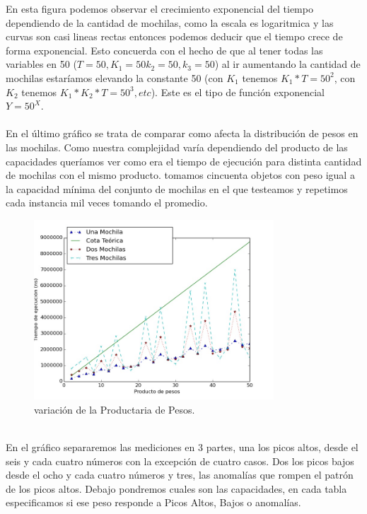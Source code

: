 \documentclass[spanish,12pt]{article}
\begin{document}
{En esta figura podemos observar el crecimiento exponencial del tiempo dependiendo de la cantidad de mochilas, como la escala es logaritmica y las curvas son casi lineas rectas entonces podemos deducir que el tiempo crece de forma exponencial. Esto concuerda con el hecho de que al tener todas las variables en 50 ($T=50, K_1 =50 k_2=50, k_3=50$) al ir aumentando la cantidad de mochilas estaríamos elevando la constante 50 (con $K_1$ tenemos $K_1*T=50^2$, con $K_2$ tenemos $K_1*K_2*T=50^3, etc $). Este es el tipo de función exponencial $Y=50^X$.
\\
\\
En el último gráfico se trata de comparar como afecta la distribución de pesos en las mochilas. Como nuestra complejidad varía dependiendo del producto de las capacidades queríamos ver como era el tiempo de ejecución para distinta cantidad de mochilas con el mismo producto. tomamos cincuenta objetos con peso igual a la capacidad mínima del conjunto de mochilas en el que testeamos y repetimos cada instancia mil veces tomando el promedio.
\begin{figure}[H]
\centering
\includegraphics[width=0.8\textwidth]{MismoPesoCompRang}
\caption{variación de la Productaria de Pesos.}
\end{figure}
\\
En el gráfico separaremos las mediciones en 3 partes, una los picos altos, desde el seis y cada cuatro números con la excepción de cuatro casos. Dos los picos bajos desde el ocho y cada cuatro números y tres, las anomalías que rompen el patrón de los picos altos. Debajo pondremos cuales son las capacidades, en cada tabla especificamos si ese peso responde a Picos Altos, Bajos o anomalías.
\\


}
\end{document}
